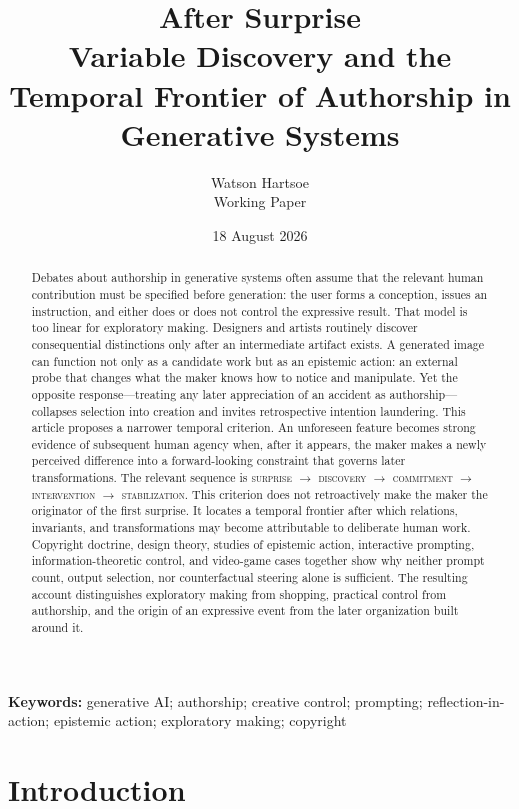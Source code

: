 \documentclass[11pt]{article}
\title{\vspace{-2em}\textbf{After Surprise}\\[0.25em]\large Variable Discovery and the Temporal Frontier of Authorship in Generative Systems}
\author{Watson Hartsoe\\\small Working Paper}
\date{18 August 2026}
\newcommand{\term}[1]{\textsc{#1}}
\begin{document}
\maketitle
\thispagestyle{firstpage}

\begin{abstract}
Debates about authorship in generative systems often assume that the relevant human contribution must be specified before generation: the user forms a conception, issues an instruction, and either does or does not control the expressive result. That model is too linear for exploratory making. Designers and artists routinely discover consequential distinctions only after an intermediate artifact exists. A generated image can function not only as a candidate work but as an epistemic action: an external probe that changes what the maker knows how to notice and manipulate. Yet the opposite response---treating any later appreciation of an accident as authorship---collapses selection into creation and invites retrospective intention laundering. This article proposes a narrower temporal criterion. An unforeseen feature becomes strong evidence of subsequent human agency when, after it appears, the maker makes a newly perceived difference into a forward-looking constraint that governs later transformations. The relevant sequence is \term{surprise $\rightarrow$ discovery $\rightarrow$ commitment $\rightarrow$ intervention $\rightarrow$ stabilization}. This criterion does not retroactively make the maker the originator of the first surprise. It locates a temporal frontier after which relations, invariants, and transformations may become attributable to deliberate human work. Copyright doctrine, design theory, studies of epistemic action, interactive prompting, information-theoretic control, and video-game cases together show why neither prompt count, output selection, nor counterfactual steering alone is sufficient. The resulting account distinguishes exploratory making from shopping, practical control from authorship, and the origin of an expressive event from the later organization built around it.
\end{abstract}

\noindent\textbf{Keywords:} generative AI; authorship; creative control; prompting; reflection-in-action; epistemic action; exploratory making; copyright

\section{Introduction}
\end{document}
